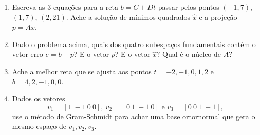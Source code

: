 \documentclass[leqno]{article}
\numberwithin{equation}{section}
\begin{document}
\begin{enumerate}


\item Escreva as 3 equações para a reta $b = C + Dt$ passar pelos pontos $(-1,7)$, $(1,7)$, $(2,21)$. Ache a solução de mínimos quadrados $\hat{x}$ e a projeção $p = A\hat{x}$.

\begin{sol}

    
\end{sol}


\item Dado o problema acima, quais dos quatro subespaços fundamentais contêm o vetor erro $e = b - p$? E o vetor $p$? E o vetor $\hat{x}$? Qual é o núcleo de $A$?

\begin{sol}

    
\end{sol}


\item Ache a melhor reta que se ajusta aos pontos $t = -2, -1, 0, 1, 2$ e $b = 4, 2, -1, 0, 0$.

\begin{sol}

    
\end{sol}


\item Dados os vetores
$$v_1 = [1 \ -1 \ 0 \ 0], \ v_2 = [0 \ 1 \ -1 \ 0] \mbox{ e } v_3 = [0 \ 0 \ 1 \ -1],$$
use o método de Gram-Schmidt para achar uma base ortornormal que gera o mesmo espaço de $v_1, v_2, v_3$.


\end{enumerate}
\end{document}
